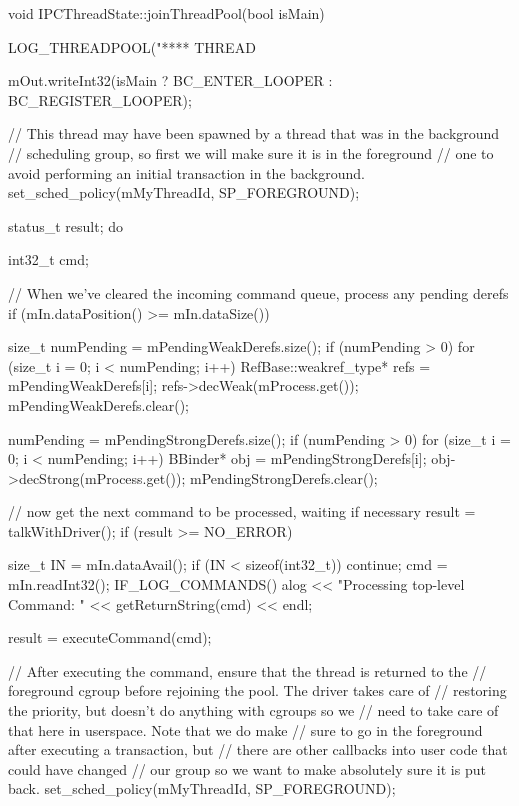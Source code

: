 \begin{cpp}
void IPCThreadState::joinThreadPool(bool isMain)
{
    LOG_THREADPOOL("**** THREAD %

    mOut.writeInt32(isMain ? BC_ENTER_LOOPER : BC_REGISTER_LOOPER);
    
    // This thread may have been spawned by a thread that was in the background
    // scheduling group, so first we will make sure it is in the foreground
    // one to avoid performing an initial transaction in the background.
    set_sched_policy(mMyThreadId, SP_FOREGROUND);
        
    status_t result;
    do {
        int32_t cmd;
        
        // When we've cleared the incoming command queue, process any pending derefs
        if (mIn.dataPosition() >= mIn.dataSize()) {
            size_t numPending = mPendingWeakDerefs.size();
            if (numPending > 0) {
                for (size_t i = 0; i < numPending; i++) {
                    RefBase::weakref_type* refs = mPendingWeakDerefs[i];
                    refs->decWeak(mProcess.get());
                }
                mPendingWeakDerefs.clear();
            }

            numPending = mPendingStrongDerefs.size();
            if (numPending > 0) {
                for (size_t i = 0; i < numPending; i++) {
                    BBinder* obj = mPendingStrongDerefs[i];
                    obj->decStrong(mProcess.get());
                }
                mPendingStrongDerefs.clear();
            }
        }

        // now get the next command to be processed, waiting if necessary
        result = talkWithDriver();
        if (result >= NO_ERROR) {
            size_t IN = mIn.dataAvail();
            if (IN < sizeof(int32_t)) continue;
            cmd = mIn.readInt32();
            IF_LOG_COMMANDS() {
                alog << "Processing top-level Command: "
                    << getReturnString(cmd) << endl;
            }


            result = executeCommand(cmd);
        }
        
        // After executing the command, ensure that the thread is returned to the
        // foreground cgroup before rejoining the pool.  The driver takes care of
        // restoring the priority, but doesn't do anything with cgroups so we
        // need to take care of that here in userspace.  Note that we do make
        // sure to go in the foreground after executing a transaction, but
        // there are other callbacks into user code that could have changed
        // our group so we want to make absolutely sure it is put back.
        set_sched_policy(mMyThreadId, SP_FOREGROUND);

}}
\end{cpp}
